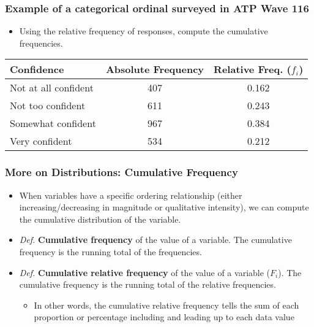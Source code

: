 \documentclass[handout]{beamer} %
\begin{document}
\begin{frame}
\frametitle{Example of a categorical ordinal surveyed in ATP Wave 116}
\begin{itemize}
\item Using the relative frequency of responses, compute the cumulative frequencies.
\end{itemize}

{\small \centering
\begin{tabular}{|l|c|c|}
\hline
Confidence & Absolute Frequency & Relative Freq. ($f_i$) \\
\hline
Not at all confident & 407 & 0.162 \\
Not too confident & 611 & 0.243 \\
Somewhat confident & 967 & 0.384 \\
Very confident & 534 & 0.212 \\
\hline
\end{tabular}
\par}

\end{frame}

\begin{frame}
\frametitle{More on Distributions: Cumulative Frequency}
\begin{itemize}
\item When variables have a specific ordering relationship (either increasing/decreasing in magnitude or qualitative intensity), we can compute the cumulative distribution of the variable.
\item \emph{Def.} \textbf{Cumulative frequency} of the value of a variable. The cumulative frequency is the running total of the frequencies.
\item \emph{Def.} \textbf{Cumulative relative frequency} of the value of a variable ($F_i$). The cumulative frequency is the running total of the relative frequencies.
\begin{itemize}
    \item In other words, the cumulative relative frequency tells the sum of each proportion or percentage including and leading up to each data value
\end{itemize}
\end{itemize}
\end{frame}
\end{document}
